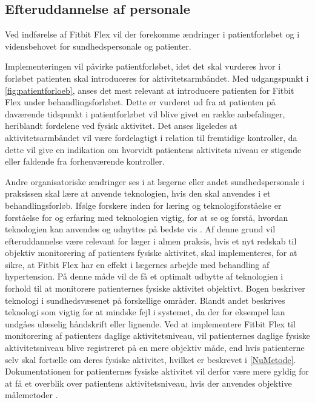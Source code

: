 \subsection{Efteruddannelse af personale}
\label{sec:efteruddannelse}
Ved indførelse af Fitbit Flex vil der forekomme ændringer i patientforløbet og i vidensbehovet for sundhedspersonale og patienter. 

Implementeringen vil påvirke patientforløbet, idet det skal vurderes hvor i forløbet patienten skal introduceres for aktivitetsarmbåndet. 
Med udgangspunkt i \autoref{fig:patientforloeb}, anses det mest relevant at introducere patienten for Fitbit Flex under behandlingsforløbet. Dette er vurderet ud fra at patienten på daværende tidspunkt i patientforløbet vil blive givet en række anbefalinger, heriblandt fordelene ved fysisk aktivitet. 
Det anses ligeledes at aktivitetsarmbåndet vil være fordelagtigt i relation til fremtidige kontroller, da dette vil give en indikation om hvorvidt patientens aktivitets niveau er stigende eller faldende fra forhenværende kontroller.   

Andre organisatoriske ændringer ses i at lægerne eller andet sundhedspersonale i praksissen skal lære at anvende teknologien, hvis den skal anvendes i et behandlingsforløb. 
Ifølge forskere inden for læring og teknologiforståelse er forståelse for og erfaring med teknologien vigtig, for at se og forstå, hvordan teknologien kan anvendes og udnyttes på bedste vis \citep{aarhusuniversitet2013}. 
Af denne grund vil efteruddannelse være relevant for læger i almen praksis, hvis et nyt redskab til objektiv monitorering af patienters fysiske aktivitet, skal implementeres, for at sikre, at Fitbit Flex har en effekt i lægernes arbejde med behandling af hypertension. På denne måde vil de få et optimalt udbytte af teknologien i forhold til at monitorere patienternes fysiske aktivitet objektivt. Bogen  beskriver teknologi i sundhedsvæsenet på forskellige områder. Blandt andet beskrives teknologi som vigtig for at mindske fejl i systemet, da der for eksempel kan undgåes ulæselig håndskrift eller lignende. Ved at implementere Fitbit Flex til monitorering af patienters daglige aktivitetsniveau, vil patienternes daglige fysiske aktivitetsniveau blive registreret på en mere objektiv måde, end hvis patienterne selv skal fortælle om deres fysiske aktivitet, hvilket er beskrevet i \autoref{NuMetode}. Dokumentationen for patienternes fysiske aktivitet vil derfor være mere gyldig for at få et overblik over patientens aktivitetsniveau, hvis der anvendes objektive målemetoder \citep{hasse2012}. 

